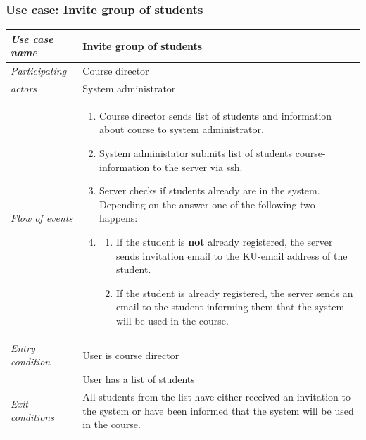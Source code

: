 \documentclass[11pt,a4paper]{report}
\begin{document}
\subsubsection{Use case: Invite group of students}
\begin{tabular}{l p{}}
    \toprule
    \textit{Use case name} & Invite group of students\\
    \midrule
    \textit{Participating} & Course director \\
    \textit{actors} & System administrator \\
    \midrule
    \textit{Flow of events} &
    \vspace{-6.7mm} \begin{enumerate}
        \item Course director sends list of students and information about course to system administrator.
        \item System administator submits list of students course-information to the server via ssh.
        \item Server checks if students already are in the system. Depending on the answer one of the following two happens:
        \item
        \begin{enumerate}
            \item If the student is \textbf{not} already registered, the server sends invitation email to the KU-email address of the student.
            \item If the student is already registered, the server sends an email to the student informing them that the system will be used in the course.
        \end{enumerate}
    \end{enumerate}
    \\
    \midrule
    \textit{Entry condition} & User is course director \\
                             & User has a list of students \\
    \midrule
    \textit{Exit conditions} & All students from the list have either received an invitation to the system or have been informed that the system will be used in the course. \\
    \bottomrule
\end{tabular}
\end{document}
